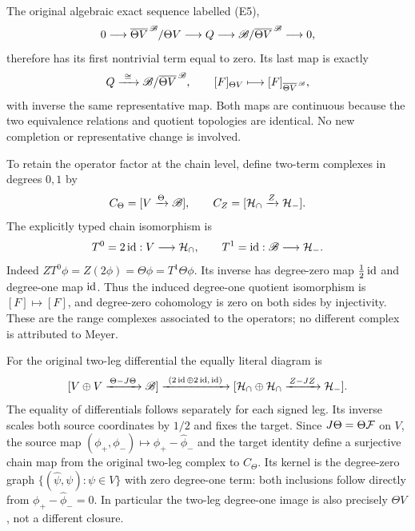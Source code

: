 The original algebraic exact sequence labelled (E5),
\[
 0\longrightarrow
 \overline{\Theta V}^{\,\mathscr B}/\Theta V\longrightarrow Q
 \longrightarrow\mathscr B/\overline{\Theta V}^{\,\mathscr B}\longrightarrow0,
\]
therefore has its first nontrivial term equal to zero. Its last map
is exactly
\begin{equation}\label{ltheta:eq:E5}
 Q\xrightarrow{\ \cong\ }\mathscr B/\overline{\Theta V}^{\,\mathscr B},
 \qquad [F]_{\Theta V}\longmapsto[F]_{\overline{\Theta V}^{\,\mathscr B}},
\end{equation}
with inverse the same representative map. Both maps are continuous
because the two equivalence relations and quotient topologies are
identical. No new completion or representative change is involved.

To retain the operator factor at the chain level, define two-term
complexes in degrees $0,1$ by
\[
 C_\Theta=[V\xrightarrow{\Theta}\mathscr B],\qquad
 C_Z=[\mathcal H_\cap\xrightarrow{Z}\mathcal H_-].
\]
The explicitly typed chain isomorphism is
\begin{equation}\label{ltheta:eq:chain}
 T^0=2\operatorname{id}:V\longrightarrow\mathcal H_\cap,\qquad
 T^1=\operatorname{id}:\mathscr B\longrightarrow\mathcal H_-.
\end{equation}
Indeed $ZT^0\phi=Z(2\phi)=\Theta\phi=T^1\Theta\phi$.
Its inverse has degree-zero map $\tfrac12\operatorname{id}$ and degree-one map
$\operatorname{id}$. Thus the induced degree-one quotient isomorphism is
$[F]\mapsto[F]$, and degree-zero cohomology is zero on both sides
by injectivity. These are the range complexes associated to the
operators; no different complex is attributed to Meyer.

For the original two-leg differential the equally literal diagram is
\[
 [V\oplus V\xrightarrow{\,\Theta-J\Theta\,}\mathscr B]
 \xrightarrow{\ (2\operatorname{id}\oplus2\operatorname{id},\,\operatorname{id})\ }
 [\mathcal H_\cap\oplus\mathcal H_\cap\xrightarrow{\,Z-JZ\,}\mathcal H_-].
\]
The equality of differentials follows separately for each signed leg.
Its inverse scales both source coordinates by $1/2$ and fixes the
target. Since $J\Theta=\Theta\mathcal F$ on $V$, the source map
$(\phi_+,\phi_-)\mapsto\phi_+-\widehat\phi_-$ and the target identity
define a surjective chain map from the original two-leg complex to
$C_\Theta$. Its kernel is the degree-zero graph
$\{(\widehat\psi,\psi):\psi\in V\}$ with zero degree-one term:
both inclusions follow directly from
$\phi_+-\widehat\phi_-=0$. In particular the two-leg degree-one image
is also precisely $\Theta V$, not a different closure.

